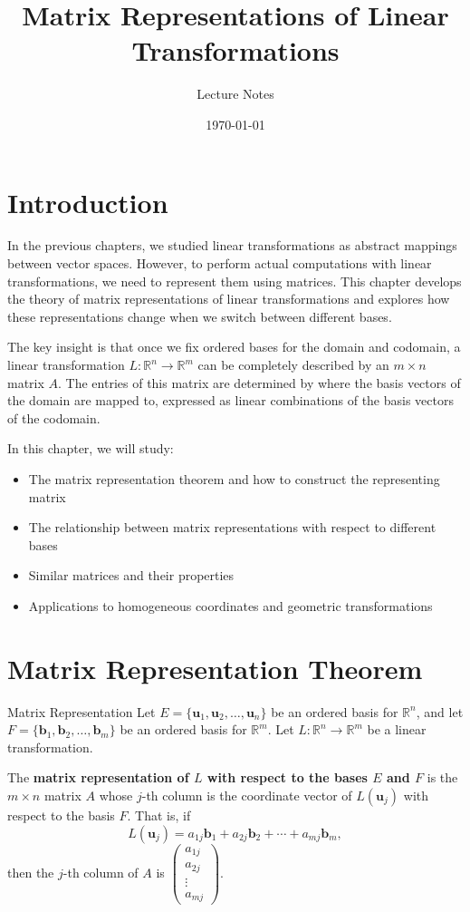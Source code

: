 \documentclass[12pt,a4paper]{article}
\title{\textbf{Matrix Representations of Linear Transformations}}
\author{Lecture Notes}
\date{\today}
\newcommand{\R}{\mathbb{R}}
\newcommand{\vv}[1]{\mathbf{#1}}
\begin{document}
	
	\maketitle
	
	\tableofcontents
	
	\newpage
	
	\section{Introduction}
	
	In the previous chapters, we studied linear transformations as abstract mappings between vector spaces. However, to perform actual computations with linear transformations, we need to represent them using matrices. This chapter develops the theory of matrix representations of linear transformations and explores how these representations change when we switch between different bases.
	
	The key insight is that once we fix ordered bases for the domain and codomain, a linear transformation $L: \R^n \to \R^m$ can be completely described by an $m \times n$ matrix $A$. The entries of this matrix are determined by where the basis vectors of the domain are mapped to, expressed as linear combinations of the basis vectors of the codomain.
	
	In this chapter, we will study:
	\begin{itemize}
		\item The matrix representation theorem and how to construct the representing matrix
		\item The relationship between matrix representations with respect to different bases
		\item Similar matrices and their properties
		\item Applications to homogeneous coordinates and geometric transformations
	\end{itemize}
	
	\section{Matrix Representation Theorem}
	
	\begin{definition}{Matrix Representation}
		Let $E = \{\vv{u}_1, \vv{u}_2, \ldots, \vv{u}_n\}$ be an ordered basis for $\R^n$, and let $F = \{\vv{b}_1, \vv{b}_2, \ldots, \vv{b}_m\}$ be an ordered basis for $\R^m$. Let $L: \R^n \to \R^m$ be a linear transformation.
		
		The \textbf{matrix representation of $L$ with respect to the bases $E$ and $F$} is the $m \times n$ matrix $A$ whose $j$-th column is the coordinate vector of $L(\vv{u}_j)$ with respect to the basis $F$. That is, if
		\[
		L(\vv{u}_j) = a_{1j}\vv{b}_1 + a_{2j}\vv{b}_2 + \cdots + a_{mj}\vv{b}_m,
		\]
		then the $j$-th column of $A$ is $\begin{pmatrix} a_{1j} \\ a_{2j} \\ \vdots \\ a_{mj} \end{pmatrix}$.
	\end{definition}
	
\end{document}
